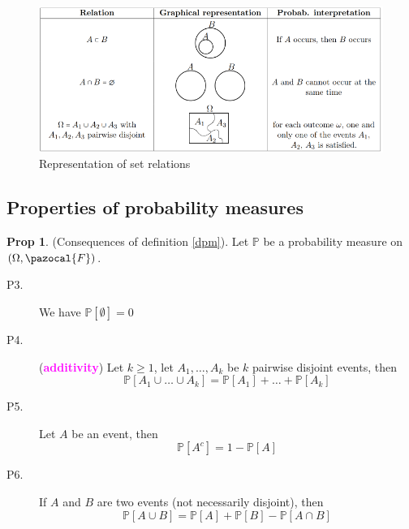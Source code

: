 \documentclass[8pt,a4paper,landscape]{article}
\theoremstyle{definition}
\theoremstyle{example}
\theoremstyle{intuition}
\theoremstyle{definition}
\newtheorem{proposition}{Prop}[section]
\newcommand{\Fb}{\pazocal{F}}
\newcommand{\mydef}[1]{\textcolor{magenta}{\textbf{#1}}}
\newcommand{\prob}[1]{\mathbb{P}\left[ #1 \right]}
\begin{document}
\begin{multicols}{3}
				
				\begin{figure}[H]
					\includegraphics[width=\linewidth]{set-relations-representation.png}
					\caption{Representation of set relations}
				\end{figure}
				
				
			\subsection{Properties of probability measures}
			
				\begin{proposition}	
					(Consequences of definition \ref{dpm}). Let $\mathbb{P}$ be a probability measure on $(\Omega, \Fb)$.
					\begin{description}
						\item[P3.] We have $\mathbb{P}\left[\emptyset\right] = 0$
						\item[P4.] (\mydef{additivity}) Let $k \geq 1$, let $A_1, \ldots , A_k$ be $k$ pairwise disjoint events, then 
							$$
								\mathbb{P}\left[A_1 \cup \ldots \cup A_k \right] = \prob{A_1} + \ldots + \mathbb{P}\left[ A_k \right]
							$$
						\item[P5.] Let $A$ be an event, then
							$$
								\prob{A^c} = 1 - \prob{A}
							$$
						\item[P6.] If $A$ and $B$ are two events (not necessarily disjoint), then 
							$$
								\prob{A \cup B} = \prob{A} + \prob{B} - \prob{A \cap B}
							$$
					\end{description}
				\end{proposition}
				

\end{multicols}
\end{document}
